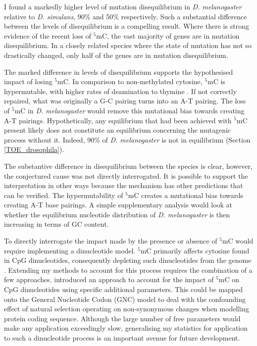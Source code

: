 I found a markedly higher level of mutation disequilibrium in \textit{D. melanogaster} relative to \textit{D. simulans}, 90\% and 50\% respectively. Such a substantial difference between the levels of disequilibrium is a compelling result. Where there is strong evidence of the recent loss of $^5$mC, the vast majority of genes are in mutation disequilibrium. In a closely related species where the state of mutation has not so drastically changed, only half of the genes are in mutation disequilibrium.

The marked difference in levels of disequilibrium supports the hypothesised impact of losing $^5$mC. In comparison to non-methylated cytosine, $^5$mC is hypermutable, with higher rates of deamination to thymine \citep{Shen1994TheDNA, Coulondre1978MolecularColi}. If not correctly repaired, what was originally a G-C pairing turns into an A-T pairing. The loss of $^5$mC in \textit{D. melanogaster} would remove this mutational bias towards creating A-T pairings. Hypothetically, any equilibrium that had been achieved with $^5$mC present likely does not constitute an equilibrium concerning the mutagenic process without it. Indeed, 90\% of \textit{D. melanogaster} is not in equilibrium (Section \ref{TOE_drosophila}). 

The substantive difference in disequilibrium between the species is clear, however, the conjectured cause was not directly interrogated. It is possible to support the interpretation in other ways because the mechanism has other predictions that can be verified. The hypermutability of $^5$mC creates a mutational bias towards creating A-T base pairings. A simple supplementary analysis would look at whether the equilibrium nucleotide distribution of \textit{D. melanogaster} is then increasing in terms of GC content. 

To directly interrogate the impact made by the presence or absence of $^5$mC would require implementing a dinucleotide model. $^5$mC primarily affects cytosine found in CpG dinucleotides, consequently depleting such dinucleotides from the genome \citep{Holliday1975DNADevelopment, Bird1980DNADNA}. Extending my methods to account for this process requires the combination of a few approaches. \cite{Huttley2004ModelingMammals} introduced an approach to account for the impact of $^5$mC on CpG dinucleotides using specific additional parameters. This could be mapped onto the General Nucleotide Codon (GNC) model \citep{Kaehler2017StandardData} to deal with the confounding effect of natural selection operating on non-synonymous changes when modelling protein coding sequence. Although the large number of free parameters would make any application exceedingly slow, generalising my statistics for application to such a dinucleotide process is an important avenue for future development. 

